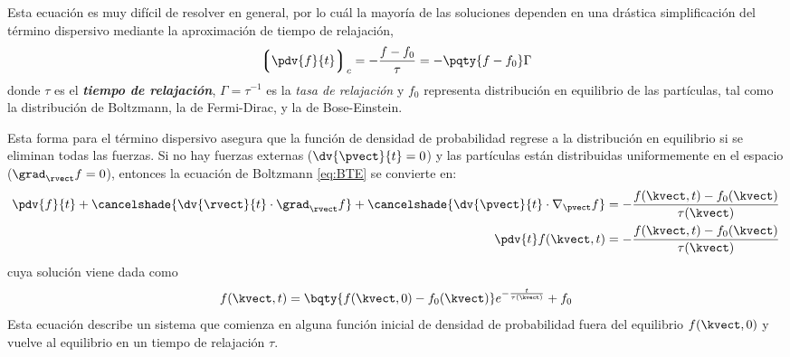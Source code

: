 Esta ecuación es muy difícil de resolver en general, por lo cuál la mayoría de las soluciones dependen en una drástica simplificación del término dispersivo mediante la aproximación de tiempo de relajación,
\begin{equation}\label{eq:RTapproximation}
\left\lgroup \pdv{f}{t} \right\rgroup_{c} = - \frac{f - f_0}{\tau} = -\pqty{ f - f_0 } \Gamma
\end{equation}
donde $ \tau $ es el \emph{\textbf{tiempo de relajación}}, $ \Gamma = \tau^{-1} $ es la \emph{tasa de relajación} y $ f_0 $ representa distribución en equilibrio de las partículas, tal como la distribución de Boltzmann, la de Fermi-Dirac, y la de Bose-Einstein.

Esta forma para el término dispersivo asegura que la función de densidad de probabilidad regrese a la distribución en equilibrio si se eliminan todas las fuerzas. Si no hay fuerzas externas ($ \dv{\pvect}{t} = 0 $) y las partículas están distribuidas uniformemente en el espacio ($ \grad_{\rvect}{f} = 0 $), entonces la ecuación de Boltzmann \eqref{eq:BTE} se convierte en:
\begin{align}\label{eq:freeForceBTE}
\pdv{f}{t} + \cancelshade{\dv{\rvect}{t} \cdot \grad_{\rvect}{f}} + \cancelshade{\dv{\pvect}{t} \cdot \nabla_{\pvect}{f}} &= - \frac{f(\kvect, t) - f_0(\kvect)}{\tau(\kvect)} \nonumber\\
\pdv{t} f(\kvect, t)  &= - \frac{f(\kvect, t) - f_0(\kvect)}{\tau(\kvect)}
\end{align}
cuya solución viene dada como
\begin{equation}\label{eq:RTsolution}
f(\kvect, t) = \bqty{f(\kvect, 0) - f_0(\kvect)}e^{-\frac{t}{\tau(\kvect)}} + f_0
\end{equation}
Esta ecuación describe un sistema que comienza en alguna función inicial de densidad de probabilidad fuera del equilibrio $ f(\kvect, 0) $ y vuelve al equilibrio en un tiempo de relajación $ \tau $.